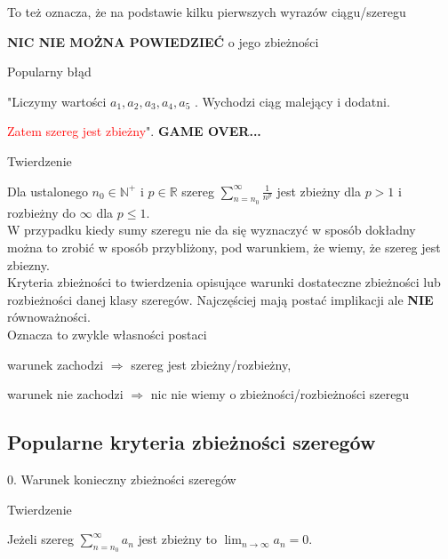 To też oznacza, że na podstawie kilku pierwszych wyrazów ciągu/szeregu

\textbf{NIC NIE MOŻNA POWIEDZIEĆ} o jego zbieżności \\

\begin{blad}{Popularny błąd}

"Liczymy wartości $ a_1, a_2, a_3, a_4, a_5$ . Wychodzi ciąg malejący i dodatni.

\textcolor{red}{Zatem szereg jest zbieżny}". \textbf{GAME OVER...} 
\end{blad}

\begin{tw}{Twierdzenie}

Dla ustalonego $ n_0 \in \mathbb{N}^+ $ i $ p \in \mathbb{R} $ szereg $ \sum\limits_{n = n_0}^{\infty} \frac{1}{n^p} $
jest zbieżny dla $ p > 1 $ i rozbieżny do $\infty$ dla $p \leq 1$.  \\

W przypadku kiedy sumy szeregu nie da się wyznaczyć w sposób dokładny można to zrobić w sposób przybliżony, pod warunkiem, że wiemy,
że szereg jest zbiezny. \\

Kryteria zbieżności to twierdzenia opisujące warunki dostateczne zbieżności lub rozbieżności danej klasy szeregów. Najczęściej mają postać
implikacji ale \textbf{NIE} równoważności. \\

Oznacza to zwykle własności postaci

\quad warunek zachodzi $ \Rightarrow $ szereg jest zbieżny/rozbieżny,

\quad warunek nie zachodzi $\Rightarrow$ nic nie wiemy o zbieżności/rozbieżności szeregu
\end{tw}

\subsection*{Popularne kryteria zbieżności szeregów}

0. Warunek konieczny zbieżności szeregów \\ 

\begin{tw}{Twierdzenie}

Jeżeli szereg $ \sum\limits_{n = n_0}^{\infty} a_n $ jest zbieżny to $ \lim_{n \to \infty} a_n = 0 $.
\end{tw}

